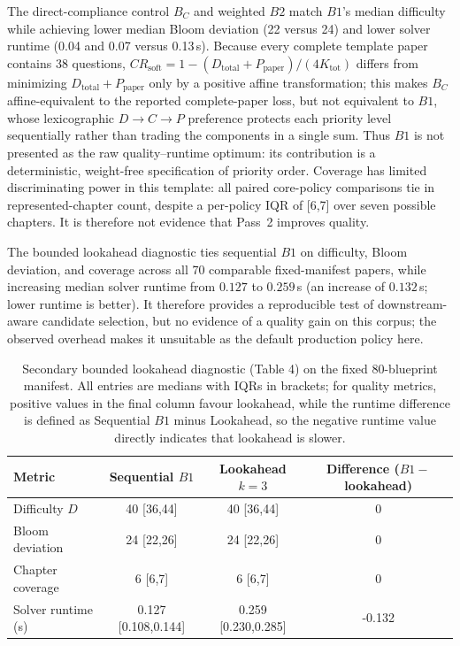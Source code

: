 \documentclass[runningheads]{llncs}
\begin{document}
The direct-compliance control $B_C$ and weighted $B2$ match $B1$'s median difficulty while achieving lower median Bloom deviation (22 versus 24) and lower solver runtime (0.04 and 0.07 versus 0.13\,s). Because every complete template paper contains 38 questions, $CR_{\mathrm{soft}}=1-(D_{\mathrm{total}}+P_{\mathrm{paper}})/(4K_{\mathrm{tot}})$ differs from minimizing $D_{\mathrm{total}}+P_{\mathrm{paper}}$ only by a positive affine transformation; this makes $B_C$ affine-equivalent to the reported complete-paper loss, but not equivalent to $B1$, whose lexicographic $D\to C\to P$ preference protects each priority level sequentially rather than trading the components in a single sum. Thus $B1$ is not presented as the raw quality--runtime optimum: its contribution is a deterministic, weight-free specification of priority order. Coverage has limited discriminating power in this template: all paired core-policy comparisons tie in represented-chapter count, despite a per-policy IQR of [6,7] over seven possible chapters. It is therefore not evidence that Pass~2 improves quality.

The bounded lookahead diagnostic ties sequential $B1$ on difficulty, Bloom deviation, and coverage across all 70 comparable fixed-manifest papers, while increasing median solver runtime from $0.127$ to $0.259$\,s (an increase of $0.132$\,s; lower runtime is better). It therefore provides a reproducible test of downstream-aware candidate selection, but no evidence of a quality gain on this corpus; the observed overhead makes it unsuitable as the default production policy here.

\begin{table}[t]
\caption{Secondary bounded lookahead diagnostic (Table 4) on the fixed 80-blueprint manifest. All entries are medians with IQRs in brackets; for quality metrics, positive values in the final column favour lookahead, while the runtime difference is defined as Sequential $B1$ minus Lookahead, so the negative runtime value directly indicates that lookahead is slower.}
\label{tab:lookahead}
\centering
\small
\begin{tabular}{@{}lccc@{}}
\toprule
Metric & Sequential $B1$ & Lookahead $k{=}3$ & Difference ($B1-$lookahead) \\
\midrule
Difficulty $D$ & 40 [36,44] & 40 [36,44] & 0 \\
Bloom deviation & 24 [22,26] & 24 [22,26] & 0 \\
Chapter coverage & 6 [6,7] & 6 [6,7] & 0 \\
Solver runtime (s) & 0.127 [0.108,0.144] & 0.259 [0.230,0.285] & -0.132 \\
\bottomrule
\end{tabular}
\end{table}
\end{document}
